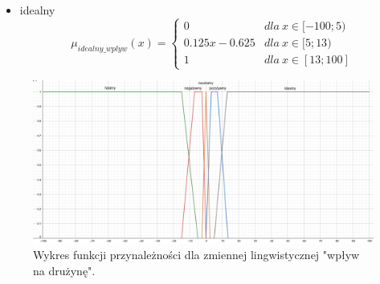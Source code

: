 \documentclass{classrep}
\begin{document}
\begin{enumerate}
\begin{itemize}
        \item idealny
        \begin{equation}
            \mu_{idealny\_wplyw}(x) = \left\{\begin{matrix} 0 & dla \: x\in [-100;5) \\ 0.125x - 0.625 & dla \: x\in[5;13) \\ 1 & dla \: x\in [13;100] \end{matrix}\right.
        \end{equation}
    \end{itemize}
    \begin{figure}[H]
        \centering
        \includegraphics[width=14cm]{wykres_wplyw.png}
        \caption{Wykres funkcji przynależności dla zmiennej lingwistycznej "wpływ na drużynę".}
        \label{rysunek:wplyw}
    \end{figure}
    

\end{enumerate}
\end{document}
